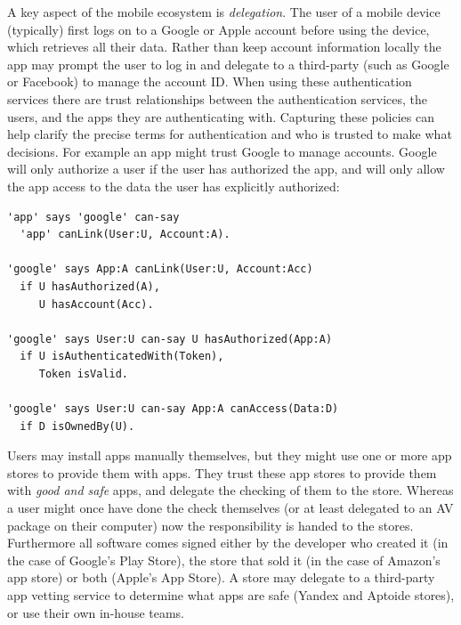 \documentclass[thesis.tex]{subfiles}
\begin{document}
A key aspect of the mobile ecosystem is \emph{delegation}. The user of a mobile
device (typically) first logs on to a Google or Apple account before using the
device, which retrieves all their data. Rather than keep account information
locally the app may prompt the user to log in and delegate to a third-party
(such as Google or Facebook) to manage the account ID. When using these
authentication services there are trust relationships between the authentication
services, the users, and the apps they are authenticating with. Capturing these
policies can help clarify the precise terms for authentication and who is
trusted to make what decisions. For example an app might trust Google to manage
accounts. Google will only authorize a user if the user has authorized the app,
and will only allow the app access to the data the user has explicitly
authorized:
\begin{lstlisting}
'app' says 'google' can-say 
  'app' canLink(User:U, Account:A).

'google' says App:A canLink(User:U, Account:Acc)
  if U hasAuthorized(A),
     U hasAccount(Acc).

'google' says User:U can-say U hasAuthorized(App:A)
  if U isAuthenticatedWith(Token),
     Token isValid.

'google' says User:U can-say App:A canAccess(Data:D)
  if D isOwnedBy(U).
\end{lstlisting}

Users may install apps manually themselves, but they might use one or
more app stores to provide them with apps.  They trust these app
stores to provide them with \emph{good and safe} apps, and delegate
the checking of them to the store.  Whereas a user might once have
done the check themselves (or at least delegated to an \ac{AV} package
on their computer) now the responsibility is handed to the stores.
Furthermore all software comes signed either by the developer who
created it (in the case of Google's Play Store), the store that sold
it (in the case of Amazon's app store) or both (Apple's App Store).  A
store may delegate to a third-party app vetting service to determine
what apps are safe (Yandex and Aptoide stores), or use their own
in-house teams.
\end{document}
